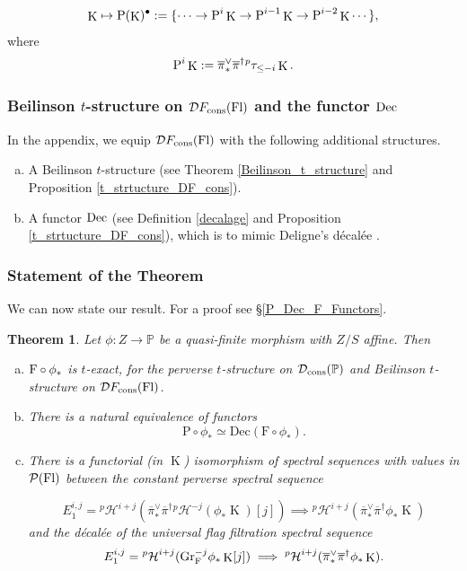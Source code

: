 \documentclass[12pt, reqno]{amsart}
\theoremstyle{plain}
\newtheorem{thm}{\bf Theorem}[subsection]
\theoremstyle{definition}
\theoremstyle{definition}
\newcommand{\bbP}{{\mathbb P}}
\newcommand{\cD}{{\mathcal D}}
\newcommand{\cP}{{\mathcal P}}
\newcommand{\cpH}{{^p\mathcal{H}}}
\DeclareMathOperator{\KK}{K}
\begin{document}
\[
\KK \mapsto \textup{P}(\KK)^{\bullet}:=\{\cdots \to \textup{P}^{i}\KK \to \textup{P}^{i-1}\KK \to \textup{P}^{i-2}\KK \cdots\},
\]
\noindent where 
\[
\textup{P}^{i}\KK:=\overline{\pi}^{\vee}_{*}\overline{\pi}^{\dagger}{}^p\tau_{\leq -i}\KK.
\]

\subsubsection{Beilinson $t$-structure on $\cD F_{\textup{cons}}(\textup{Fl})$ and the functor $\textup{Dec}$}
In the appendix, we equip $\cD F_{\textup{cons}}(\textup{Fl})$ with the following additional structures.
\begin{enumerate}[(a)]
    \item A Beilinson $t$-structure (see Theorem \ref{Beilinson_t_structure} and Proposition \ref{t_strtucture_DF_cons}).
    \item A functor $\textup{Dec}$ (see Definition \ref{decalage} and Proposition \ref{t_strtucture_DF_cons}), which is to mimic Deligne's  décalée \cite[1.3.3]{Del71}.
\end{enumerate}

\subsubsection{Statement of the Theorem}We can now state our result. For a proof see \S \ref{P_Dec_F_Functors}.
\begin{thm}\label{P_Dec_F_Functor_intro}
Let $\phi \colon Z \to \bbP$ be a quasi-finite morphism with $Z/S$ affine. Then 
\begin{enumerate}[(a)]
    \item $\textup{F}\circ \phi_*$ is $t$-exact, for the perverse $t$-structure on $\cD_{\textup{cons}}(\bbP)$ and Beilinson $t$-structure on $\cD F_{\textup{cons}}(\textup{Fl})$.
    \item There is a natural equivalence of functors
  \[
  \mathrm{P} \circ \phi_* \simeq \mathrm{Dec}(\mathrm{F}\circ\phi_*).
  \]
  \item There is a functorial (in $\KK$) isomorphism of spectral sequences with values in $\cP(\textup{Fl})$ between the constant perverse spectral sequence 

  \[
   E_1^{i,j}=\cpH^{i+j}(\overline{\pi}^{\vee}_{*}\overline{\pi}^{\dagger}\cpH^{-j}(\phi_*\KK)[j]) \implies \cpH^{i+j}(\overline{\pi}^{\vee}_{*}\overline{\pi}^{\dagger}\phi_*\KK)
   \]
   \noindent and the  d\'ecal\'ee of the universal flag filtration spectral sequence
   \[
   E_1^{i,j}=\cpH^{i+j}(\textup{Gr}^{-j}_{\textup{F}}\phi_*\KK[j]) \implies \cpH^{i+j}(\overline{\pi}^{\vee}_{*}\overline{\pi}^{\dagger}\phi_*\KK).
   \]
   
\end{enumerate}
  
\end{thm}
\end{document}
